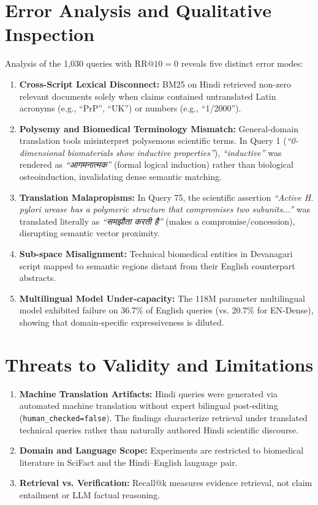 \documentclass[11pt,a4paper]{article}
\begin{document}
\section{Error Analysis and Qualitative Inspection}
\label{sec:errors}
Analysis of the 1,030 queries with $\text{RR@10} = 0$ reveals five distinct error modes:
\begin{enumerate}
    \item \textbf{Cross-Script Lexical Disconnect:} BM25 on Hindi retrieved non-zero relevant documents solely when claims contained untranslated Latin acronyms (e.g., ``PrP'', ``UK'') or numbers (e.g., ``1/2000'').
    \item \textbf{Polysemy and Biomedical Terminology Mismatch:} General-domain translation tools misinterpret polysemous scientific terms. In Query 1 (\textit{``0-dimensional biomaterials show inductive properties''}), \textit{``inductive''} was rendered as \textit{``आगमनात्मक''} (formal logical induction) rather than biological osteoinduction, invalidating dense semantic matching.
    \item \textbf{Translation Malapropisms:} In Query 75, the scientific assertion \textit{``Active H. pylori urease has a polymeric structure that compromises two subunits...''} was translated literally as \textit{``समझौता करती है''} (makes a compromise/concession), disrupting semantic vector proximity.
    \item \textbf{Sub-space Misalignment:} Technical biomedical entities in Devanagari script mapped to semantic regions distant from their English counterpart abstracts.
    \item \textbf{Multilingual Model Under-capacity:} The 118M parameter multilingual model exhibited failure on 36.7\% of English queries (vs. 20.7\% for EN-Dense), showing that domain-specific expressiveness is diluted.
\end{enumerate}

\section{Threats to Validity and Limitations}
\begin{enumerate}
    \item \textbf{Machine Translation Artifacts:} Hindi queries were generated via automated machine translation without expert bilingual post-editing (\texttt{human\_checked=false}). The findings characterize retrieval under translated technical queries rather than naturally authored Hindi scientific discourse.
    \item \textbf{Domain and Language Scope:} Experiments are restricted to biomedical literature in SciFact and the Hindi--English language pair.
    \item \textbf{Retrieval vs. Verification:} Recall@k measures evidence retrieval, not claim entailment or LLM factual reasoning.
\end{enumerate}
\end{document}
